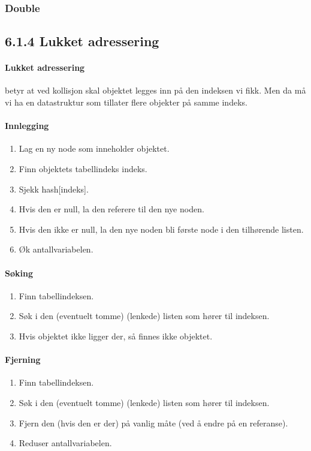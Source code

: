 \documentclass[11pt]{article}
\begin{document}
        \subsubsection{Double}

    \subsection{6.1.4 Lukket adressering}
        \paragraph{Lukket adressering} betyr at ved kollisjon skal objektet legges inn på den indeksen vi
        fikk. Men da må vi ha en datastruktur som tillater flere objekter på samme indeks.

        \paragraph{Innlegging}
        \begin{enumerate}
            \item Lag en ny node som inneholder objektet.
            \item Finn objektets tabellindeks indeks.
            \item Sjekk hash[indeks].
            \item Hvis den er null, la den referere til den nye noden.
            \item Hvis den ikke er null, la den nye noden bli første node i den tilhørende listen.
            \item Øk antallvariabelen.
        \end{enumerate}

        \paragraph{Søking}
        \begin{enumerate}
            \item Finn tabellindeksen.
            \item Søk i den (eventuelt tomme) (lenkede) listen som
                hører til indeksen.
            \item Hvis objektet ikke ligger der, så finnes ikke objektet.
        \end{enumerate}

        \paragraph{Fjerning}
        \begin{enumerate}
            \item Finn tabellindeksen.
            \item Søk i den (eventuelt tomme) (lenkede) listen som
                hører til indeksen.
            \item Fjern den (hvis den er der) på vanlig måte (ved å endre på en
                referanse).
            \item Reduser antallvariabelen.
        \end{enumerate}
\end{document}
